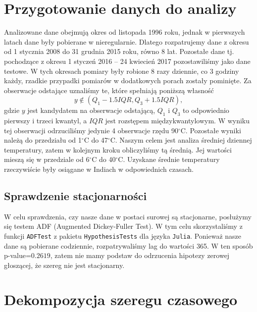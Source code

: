 \documentclass[12pt]{article}
\theoremstyle{exer}
\begin{document}
	\section{Przygotowanie danych do analizy}
	Analizowane dane obejmują okres od listopada 1996 roku, jednak w pierwszych latach dane były pobierane w nieregularnie. Dlatego rozpatrujemy dane z okresu od 1 stycznia 2008 do 31 grudnia 2015 roku, równo 8 lat. Pozostałe dane tj. pochodzące z okresu 1 styczeń 2016 -- 24 kwiecień 2017 pozostawiliśmy jako dane testowe. W tych okresach pomiary były robione 8 razy dziennie, co 3 godziny każdy, rzadkie przypadki pomiarów w dodatkowych porach zostały pominięte. Za obserwacje odstające uznaliśmy te, które spełniają poniższą własność
	\begin{equation}
		y\notin\left(Q_1-1.5IQR,Q_3+1.5IQR\right),
	\end{equation}
	gdzie $y$ jest kandydatem na obserwacje odstającą, $Q_1$ i $Q_3$ to odpowiednio pierwszy i trzeci kwantyl, a $IQR$ jest rozstępem międzykwantylowym. W wyniku tej obserwacji odrzuciliśmy jedynie 4 obserwacje rzędu 90$^\circ$C. Pozostałe wyniki należą do przedziału od 1$^\circ$C do 47$^\circ$C. Naszym celem jest analiza średniej dziennej temperatury, zatem w kolejnym kroku obliczyliśmy tą średnią. Jej wartości mieszą się w przedziale od 6$^\circ$C do 40$^\circ$C. Uzyskane średnie temperatury rzeczywiście były osiągane w Indiach w odpowiednich czasach.
	\subsection{Sprawdzenie stacjonarności}	
	W celu sprawdzenia, czy nasze dane w postaci surowej są stacjonarne, posłużymy się testem ADF (Augmented Dickey-Fuller Test). W tym celu skorzystaliśmy z funkcji \verb*|ADFTest| z pakietu \verb*|HypothesisTests| dla języka \verb*|Julia|. Ponieważ nasze dane są pobierane codziennie, rozpatrywaliśmy lag do wartości 365. W ten sposób p-value=$0.2619$, zatem nie mamy podstaw do odrzucenia hipotezy zerowej głoszącej, że szereg nie jest stacjonarny.
	
	
	
	\section{Dekompozycja szeregu czasowego}
\end{document}

